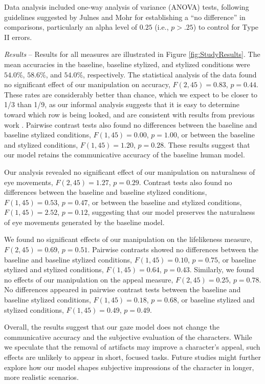 Data analysis included one-way analysis of variance (ANOVA) tests, following guidelines suggested by Julnes and Mohr \cite{julnes1989analysis} for establishing a ``no difference'' in comparisons, particularly an alpha level of $0.25$ (i.e., $p > .25$) to control for Type II errors.

\textit{Results} -- Results for all measures are illustrated in Figure \ref{fig:StudyResults}. The mean accuracies in the baseline, baseline stylized, and stylized conditions were $54.0\%$, $58.6\%$, and $54.0\%$, respectively. The statistical analysis of the data found no significant effect of our manipulation on accuracy, $F(2,45) = 0.83$, $p = 0.44$. These rates are considerably better than chance, which we expect to be closer to 1/3 than 1/9, as our informal analysis suggests that it is easy to determine toward which row is being looked, and are consistent with results from previous work \cite{argyle1976gaze,goldberg1969distance,andrist2012designing}. Pairwise contrast tests also found no differences between the baseline and baseline stylized conditions, $F(1,45) = 0.00$, $p = 1.00$, or between the baseline and stylized conditions, $F(1,45) = 1.20$, $p = 0.28$. These results suggest that our model retains the communicative accuracy of the baseline human model.

Our analysis revealed no significant effect of our manipulation on naturalness of eye movements, $F(2,45) = 1.27$, $p = 0.29$. Contrast tests also found no differences between the baseline and baseline stylized conditions, $F(1,45) = 0.53$, $p = 0.47$, or between the baseline and stylized conditions, $F(1,45) = 2.52$, $p = 0.12$, suggesting that our model preserves the naturalness of eye movements generated by the baseline model.

We found no significant effects of our manipulation on the lifelikeness measure, $F(2,45) = 0.69$, $p = 0.51$. Pairwise contrasts showed no differences between the baseline and baseline stylized conditions, $F(1,45) = 0.10$, $p = 0.75$, or baseline stylized and stylized conditions, $F(1,45) = 0.64$, $p = 0.43$. Similarly, we found no effects of our manipulation on the appeal measure, $F(2,45) = 0.25$, $p = 0.78$. No differences appeared in pairwise contrast tests between the baseline and baseline stylized conditions, $F(1,45) = 0.18$, $p = 0.68$, or baseline stylized and stylized conditions, $F(1,45) = 0.49$, $p = 0.49$.

Overall, the results suggest that our gaze model does not change the communicative accuracy and the subjective evaluation of the characters. While we speculate that the removal of artifacts may improve a character's appeal, such effects are unlikely to appear in short, focused tasks. Future studies might further explore how our model shapes subjective impressions of the character in longer, more realistic scenarios.